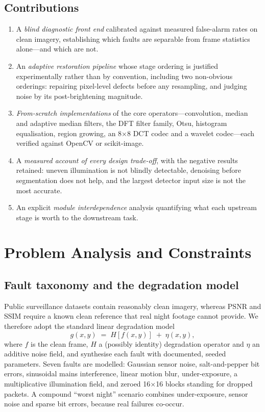 \documentclass[conference,10pt]{IEEEtran}
\begin{document}
\subsection{Contributions}
\begin{enumerate}
\item A \emph{blind diagnostic front end} calibrated against measured
      false-alarm rates on clean imagery, establishing which faults are
      separable from frame statistics alone---and which are not.
\item An \emph{adaptive restoration pipeline} whose stage ordering is
      justified experimentally rather than by convention, including two
      non-obvious orderings: repairing pixel-level defects before any
      resampling, and judging noise by its post-brightening magnitude.
\item \emph{From-scratch implementations} of the core operators---convolution,
      median and adaptive median filters, the DFT filter family, Otsu,
      histogram equalisation, region growing, an 8$\times$8 DCT codec and a
      wavelet codec---each verified against OpenCV or scikit-image.
\item A \emph{measured account of every design trade-off}, with
      the negative results retained: uneven illumination is not blindly
      detectable, denoising before segmentation does not help, and the largest
      detector input size is not the most accurate.
\item An explicit \emph{module interdependence} analysis quantifying what each
      upstream stage is worth to the downstream task.
\end{enumerate}

\section{Problem Analysis and Constraints}\label{sec:problem}

\subsection{Fault taxonomy and the degradation model}
Public surveillance datasets contain reasonably clean imagery, whereas
PSNR and SSIM require a known clean reference that real night footage cannot
provide. We therefore adopt the standard linear degradation model
\cite{gonzalez2018}
\begin{equation}
g(x,y) \;=\; H\!\left[f(x,y)\right] \;+\; \eta(x,y),
\label{eq:degradation}
\end{equation}
where $f$ is the clean frame, $H$ a (possibly identity) degradation operator
and $\eta$ an additive noise field, and synthesise each fault with documented,
seeded parameters. Seven faults are modelled: Gaussian sensor noise, salt-and-pepper
bit errors, sinusoidal mains interference, linear motion blur, under-exposure,
a multiplicative illumination field, and zeroed 16$\times$16 blocks standing
for dropped packets. A compound ``worst night'' scenario combines
under-exposure, sensor noise and sparse bit errors, because real failures
co-occur.
\end{document}

